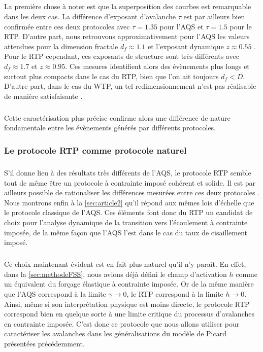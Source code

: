 \subparagraph{}La première chose à noter est que la superposition des courbes est remarquable dans les deux cas. La différence d'exposant d'avalanche $\tau$ est par ailleurs bien confirmée entre ces deux protocoles avec $\tau = 1.35$ pour l'AQS et $\tau=1.5$ pour le RTP. D'autre part, nous retrouvons approximativement pour l'AQS les valeurs attendues pour la dimension fractale $d_f\approx 1.1$ et l'exposant dynamique $z\approx 0.55$ \cite{liu_driving_2016, lin_scaling_2014}. Pour le RTP cependant, ces exposants de structure sont très différents avec $d_f \approx 1.7$ et $z\approx 0.95$. Ces mesures identifient alors des évènements plus longs et surtout plus compacts dans le cas du RTP, bien que l'on ait toujours $d_f < D$. D'autre part, dans le cas du WTP, un tel redimensionnement n'est pas réalisable de manière satisfaisante \cite{jocteur_protocol_2025}.

\subparagraph{}Cette caractérisation plus précise confirme alors une différence de nature fondamentale entre les évènements générés par différents protocoles.

\subsubsection{Le protocole RTP comme protocole naturel}

\subparagraph{}S'il donne lieu à des résultats très différents de l'AQS, le protocole RTP semble tout de même être un protocole à contrainte imposé cohérent et solide. Il est par ailleurs possible de rationaliser les différences mesurées entre ces deux protocoles \cite{jocteur_protocol_2025}. Nous montrons enfin à la \autoref{sec:article2} qu'il répond aux mêmes lois d'échelle que le protocole classique de l'AQS. Ces éléments font donc du RTP un candidat de choix pour l'analyse dynamique de la transition vers l'écoulement à contrainte imposée, de la même façon que l'AQS l'est dans le cas du taux de cisaillement imposé. 

\subparagraph{}Ce choix maintenant évident est en fait plus naturel qu'il n'y paraît. En effet, dans la \autoref{sec:methodeFSS}, nous avions déjà défini le champ d'activation $h$ comme un équivalent du forçage élastique à contrainte imposée. Or de la même manière que l'AQS correspond à la limite $\dot{\gamma} \rightarrow 0$, le RTP correspond à la limite $h\rightarrow 0$. Ainsi, même si son interprétation physique est moins directe, le protocole RTP correspond bien en quelque sorte à une limite critique du processus d'avalanches en contrainte imposée. C'est donc ce protocole que nous allons utiliser pour caractériser les avalanches dans les généralisations du modèle de Picard présentées précédemment.

